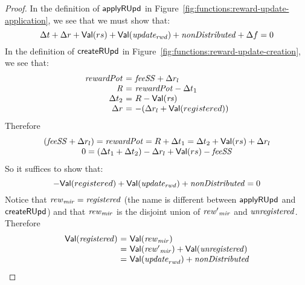 \begin{proof}
  In the definition of $\mathsf{applyRUpd}$ in Figure~\ref{fig:functions:reward-update-application},
  we see that we must show that:
  \begin{equation*}
    \Delta t + \Delta r + \mathsf{Val}(rs) + \mathsf{Val}(\mathit{update_{rwd}}) + \mathit{nonDistributed} + \Delta f = 0
  \end{equation*}
  In the definition of $\mathsf{createRUpd}$ in Figure~\ref{fig:functions:reward-update-creation},
  we see that:
  \begin{equation*}
    \begin{array}{r@{~=~}l}
      \var{rewardPot} & \var{feeSS} + \Delta r_l \\
      \var{R} & \var{rewardPot} - \Delta t_1 \\
      \Delta t_2 & R - \Val(\var{rs})\\
      \Delta r & - (\Delta r_l+\Val(registered)) \\
    \end{array}
  \end{equation*}
  Therefore
  \begin{equation*}
    \begin{array}{c}
      (\mathit{feeSS} + \Delta r_l) = \mathit{rewardPot} = R + \Delta t_1 = \Delta t_2 + \mathsf{Val}(rs) + \Delta r_l  \\
      0 = (\Delta t_1 + \Delta t_2 ) - \Delta r_l + \mathsf{Val}(rs)- \mathit{feeSS} \\
    \end{array}
  \end{equation*}
  So it suffices to show that:
  \begin{equation*}
    -\mathsf{Val}(registered) + \mathsf{Val}(\mathit{update_{rwd}}) + \mathit{nonDistributed} = 0
  \end{equation*}
  Notice that $\mathit{rew}_{\mathit{mir}} = \mathit{registered}$
    (the name is different between $\mathsf{applyRUpd}$ and $\mathsf{createRUpd}$)
    and that $\mathit{rew}_{\mathit{mir}}$ is the disjoint union of
    $\mathit{rew'}_{\mathit{mir}}$ and $\mathit{unregistered}$.
    Therefore
  \begin{equation*}
    \begin{array}{r@{~=~}l}
      \Val(\var{registered}) & \Val(\var{rew}_{\var{mir}}) \\
                             & \Val(\var{rew'}_{\var{mir}}) + \Val(\var{unregistered}) \\
                             & \Val(\var{update}_{rwd}) + \var{nonDistributed}
    \end{array}
  \end{equation*}
\end{proof}

